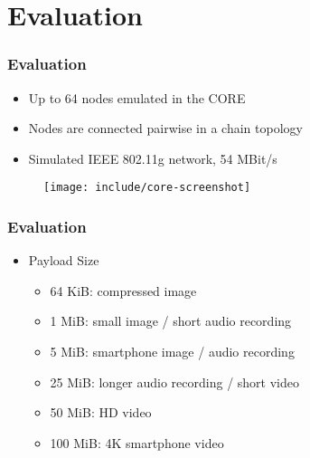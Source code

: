 \section{Evaluation}


\begin{frame}
  \frametitle{Evaluation}

  \begin{itemize}
  \item Up to 64 nodes emulated in the \acf{CORE}
  \item Nodes are connected pairwise in a chain topology
  \item Simulated IEEE 802.11g network, 54 MBit/s
  \end{itemize}

  \begin{figure}
    \texttt{[image: include/core-screenshot]}
  \end{figure}
\end{frame}

\begin{frame}
  \frametitle{Evaluation}

  \begin{itemize}
  \item Payload Size
  \begin{itemize}
    \item 64 KiB: compressed image
    \item 1 MiB: small image / short audio recording
    \item 5 MiB: smartphone image / audio recording
    \item 25 MiB: longer audio recording / short video
    \item 50 MiB: HD video
    \item 100 MiB: 4K smartphone video
  \end{itemize}
  \end{itemize}
\end{frame}
